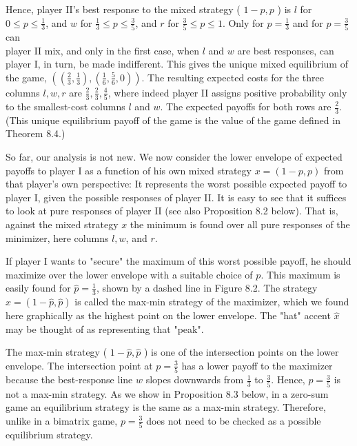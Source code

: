 \documentclass[12pt]{article}
\begin{document}
Hence, player II's best response to the mixed strategy ( $1-p, p$ ) is $l$ for $0 \leq p \leq \frac{1}{3}$, and $w$ for $\frac{1}{3} \leq p \leq \frac{3}{5}$, and $r$ for $\frac{3}{5} \leq p \leq 1$. Only for $p=\frac{1}{3}$ and for $p=\frac{3}{5}$ can\\
player II mix, and only in the first case, when $l$ and $w$ are best responses, can player I, in turn, be made indifferent. This gives the unique mixed equilibrium of the game, $\left(\left(\frac{2}{3}, \frac{1}{3}\right),\left(\frac{1}{6}, \frac{5}{6}, 0\right)\right)$. The resulting expected costs for the three columns $l, w, r$ are $\frac{2}{3}, \frac{2}{3}, \frac{4}{5}$, where indeed player II assigns positive probability only to the smallest-cost columns $l$ and $w$. The expected payoffs for both rows are $\frac{2}{3}$. (This unique equilibrium payoff of the game is the value of the game defined in Theorem 8.4.)

So far, our analysis is not new. We now consider the lower envelope of expected payoffs to player I as a function of his own mixed strategy $x=(1-p, p)$ from that player's own perspective: It represents the worst possible expected payoff to player I, given the possible responses of player II. It is easy to see that it suffices to look at pure responses of player II (see also Proposition 8.2 below). That is, against the mixed strategy $x$ the minimum is found over all pure responses of the minimizer, here columns $l, w$, and $r$.

If player I wants to "secure" the maximum of this worst possible payoff, he should maximize over the lower envelope with a suitable choice of $p$. This maximum is easily found for $\hat{p}=\frac{1}{3}$, shown by a dashed line in Figure 8.2. The strategy $\hat{x}=(1-\hat{p}, \hat{p})$ is called the max-min strategy of the maximizer, which we found here graphically as the highest point on the lower envelope. The "hat" accent $\hat{x}$ may be thought of as representing that "peak".

The max-min strategy ( $1-\hat{p}, \hat{p}$ ) is one of the intersection points on the lower envelope. The intersection point at $p=\frac{3}{5}$ has a lower payoff to the maximizer because the best-response line $w$ slopes downwards from $\frac{1}{3}$ to $\frac{3}{5}$. Hence, $p=\frac{3}{5}$ is not a max-min strategy. As we show in Proposition 8.3 below, in a zero-sum game an equilibrium strategy is the same as a max-min strategy. Therefore, unlike in a bimatrix game, $p=\frac{3}{5}$ does not need to be checked as a possible equilibrium strategy.
\end{document}
